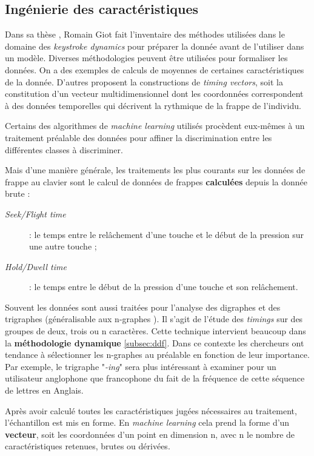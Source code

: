 \subsection{Ingénierie des caractéristiques}
\label{subsec:featureengineering}

Dans sa thèse \cite{giotThese}, Romain Giot fait l'inventaire des méthodes utilisées dans le domaine des \textit{keystroke dynamics} pour préparer la donnée avant de l'utiliser dans un modèle. Diverses méthodologies peuvent être utilisées pour formaliser les données. On a des exemples de calculs de moyennes de certaines caractéristiques de la donnée. D'autres proposent la constructions de \textit{timing vectors}\cite{killourhy2009}, soit la constitution d'un vecteur multidimensionnel dont les coordonnées correspondent à des données temporelles qui décrivent la rythmique de la frappe de l'individu.

Certains des algorithmes de \textit{machine learning} utilisés procèdent eux-mêmes à un traitement préalable des données pour affiner la discrimination entre les différentes classes à discriminer.

Mais d'une manière générale, les traitements les plus courants sur les données de frappe au clavier sont le calcul de données de frappes \textbf{calculées} depuis la donnée brute :

\begin{description}
	\item[\textit{Seek/Flight time}] : le temps entre le relâchement d'une touche et le début de la pression sur une autre touche ;
	\item[\textit{Hold/Dwell time}] : le temps entre le début de la pression d'une touche et son relâchement. \cite{kobojekRNN}
\end{description}

Souvent les données sont aussi traitées pour l'analyse des digraphes et des trigraphes (généralisable aux n-graphes \cite{Hu2008}). Il s'agit de l'étude des \textit{timings} sur des groupes de deux, trois ou n caractères. Cette technique intervient beaucoup dans la \textbf{méthodologie dynamique} \ref{subsec:ddf}. Dans ce contexte les chercheurs ont tendance à sélectionner les n-graphes au préalable en fonction de leur importance. Par exemple, le trigraphe "\textit{-ing}" sera plus intéressant à examiner pour un utilisateur anglophone que francophone du fait de la fréquence de cette séquence de lettres en Anglais.

Après avoir calculé toutes les caractéristiques jugées nécessaires au traitement, l'échantillon est mis en forme. En \textit{machine learning} cela prend la forme d'un \textbf{vecteur}, soit les coordonnées d'un point en dimension n, avec n le nombre de caractéristiques retenues, brutes ou dérivées.
